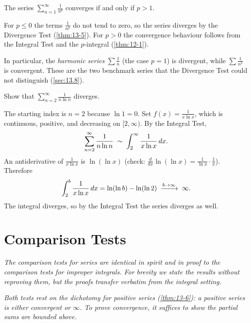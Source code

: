 \begin{theorem}
\label{thm:13-8}
The series $\displaystyle\sum_{n=1}^{\infty}\frac{1}{n^{p}}$ converges if and only if $p>1$.
\end{theorem}

\begin{remark}
For $p\le 0$ the terms $\frac{1}{n^{p}}$ do not tend to zero, so the series diverges by the Divergence Test (\cref{thm:13-5}).  For $p>0$ the convergence behaviour follows from the Integral Test and the $p$-integral (\cref{thm:12-1}).
\end{remark}

\begin{remark}
In particular, the \emph{harmonic series} $\sum\frac{1}{n}$ (the case $p=1$) is divergent, while $\sum\frac{1}{n^{2}}$ is convergent.  These are the two benchmark series that the Divergence Test could not distinguish (\cref{sec:13.8}).
\end{remark}

\begin{example}
\label{ex:13-9}
Show that $\displaystyle\sum_{n=2}^{\infty}\frac{1}{n\ln n}$ diverges.

The starting index is $n=2$ because $\ln 1=0$.  Set $f(x)=\frac{1}{x\ln x}$, which is continuous, positive, and decreasing on $[2,\infty)$.  By the Integral Test,
\[
  \sum_{n=2}^{\infty}\frac{1}{n\ln n} \;\sim\; \int_{2}^{\infty}\frac{1}{x\ln x}\,dx.
\]
An antiderivative of $\frac{1}{x\ln x}$ is $\ln(\ln x)$ (check: $\frac{d}{dx}\ln(\ln x)=\frac{1}{\ln x}\cdot\frac{1}{x}$).  Therefore
\[
  \int_{2}^{b}\frac{1}{x\ln x}\,dx = \ln(\ln b)-\ln(\ln 2) \;\xrightarrow{b\to\infty}\; \infty.
\]
The integral diverges, so by the Integral Test the series diverges as well.
\end{example}

\section{Comparison Tests}
\label{sec:13.12}

\textit{The comparison tests for series are identical in spirit and in proof to the comparison tests for improper integrals.  For brevity we state the results without reproving them, but the proofs transfer verbatim from the integral setting.}

\textit{Both tests rest on the dichotomy for positive series (\cref{thm:13-6}): a positive series is either convergent or $\infty$.  To prove convergence, it suffices to show the partial sums are bounded above.}

